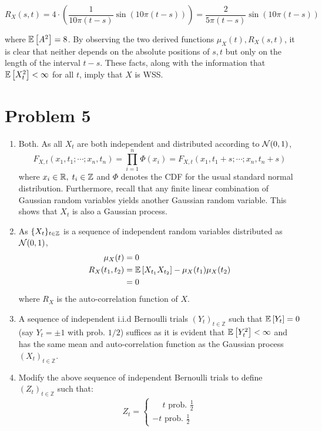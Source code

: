 \documentclass[12pt]{article}%
\begin{document}
\[R_X(s,t) = 4 \cdot \left(\frac{1}{10\pi(t-s)}\sin{(10\pi(t-s))}\right) = \frac{2}{5\pi(t-s)}\sin{(10\pi(t-s))} \]

where $\mathbb{E}\left[A^2\right] = 8$. By observing the two derived functions $\mu_X(t), R_X(s,t)$, it is clear that neither depends on the absolute positions of $s,t$ but only on the length of the interval $t-s$. These facts, along with the information that $\mathbb{E}\left[X_t^2\right] < \infty$ for all $t$, imply that $X$ is WSS.

\section{Problem 5}

\begin{enumerate}
  \item Both. As all $X_t$  are both independent and distributed according to $\mathcal{N}(0,1)$,
  \[ F_{X,t}(x_1,t_1;\cdots;x_n,t_n) = \prod_{i=1}^n \Phi(x_i) = F_{X,t}(x_1,t_1+s;\cdots;x_n,t_n+s) \]
where $x_i\in {\mathbb{R}}, \; t_i \in \mathbb{Z}$ and $\Phi$ denotes the CDF for the usual standard normal distribution. Furthermore, recall that any finite linear combination of Gaussian random variables yields another Gaussian random variable. This shows that $X_t$ is also a Gaussian process.

\item As $\{X_t\}_{t \in \mathbb{Z}}$ is a sequence of  independent random variables distributed as $\mathcal{N}(0,1)$,
%
\begin{align*}
 \mu_{X}(t) & =  0 \\
 R_X(t_1,t_2) & = \mathbb{E}\left[X_{t_1}X_{t_2}\right] - \mu_X(t_1)\mu_X(t_2) \\
 & = 0
\end{align*}
where $R_X$ is the auto-correlation function of $X$.

\item
A sequence of independent i.i.d Bernoulli trials $(Y_t)_{t \in \mathbb{Z}}$ such that $\mathbb{E}\left[Y_t\right] = 0$ (say $Y_t = \pm 1$ with prob. $1/2$) suffices as it is evident that $\mathbb{E}\left[Y_t^2\right] < \infty$ and has the same mean and auto-correlation function as the Gaussian process $(X_t)_{t \in \mathbb{Z}}$.

\item Modify the above sequence of independent Bernoulli trials to define $(Z_t)_{t \in \mathbb{Z}}$ such that:
%
\begin{align*}
  Z_t = \begin{cases}
          \phantom{-}t \text{ prob. } \frac{1}{2} \\
          -t \text{ prob. } \frac{1}{2}
        \end{cases}
\end{align*}


\end{enumerate}
\end{document}
